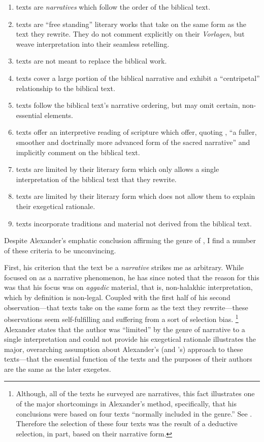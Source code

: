 \begin{enumerate}
    \item \rwb texts are \emph{narratives} which follow the order of the biblical text. 
    \item \rwb texts are ``free standing'' literary works that take on the same form as the text they rewrite. They do not comment explicitly on their \emph{Vorlagen}, but weave interpretation into their seamless retelling. 
    \item \rwb texts are not meant to replace the biblical work. 
    \item \rwb texts cover a large portion of the biblical narrative and exhibit a ``centripetal'' relationship to the biblical text. 
    \item \rwb texts follow the biblical text's narrative ordering, but may omit certain, non-essential elements. 
    \item \rwb texts offer an interpretive reading of scripture which offer, quoting \vermes, ``a fuller, smoother and doctrinally more advanced form of the sacred narrative''\autocite[Citing \vermes in][305]{schurer1986} and implicitly comment on the biblical text. 
    \item \rwb texts are limited by their literary form which only allows a single interpretation of the biblical text that they rewrite. 
    \item \rwb texts are limited by their literary form which does not allow them to explain their exegetical rationale. 
    \item \rwb texts incorporate traditions and material not derived from the biblical text.
\end{enumerate} 

Despite Alexander's emphatic conclusion affirming the genre of \RwB, I find a number of these criteria to be unconvincing.

First, his criterion that the text be a \emph{narrative} strikes me as arbitrary. While \vermes focused on \rwb as a narrative phenomenon, he has since noted that the reason for this was that his focus was on \emph{aggadic} material, that is, non-halakhic interpretation, which by definition is non-legal. Coupled with the first half of his second observation---that \rwb texts take on the same form as the text they rewrite---these observations seem self-fulfilling and suffering from a sort of selection bias.%
    \footnote{Although, all of the texts he surveyed are narratives, this fact illustrates one of the major shortcomings in Alexander's method, specifically, that his conclusions were based on four texts ``normally included in the genre.'' See \cite[99]{alexander_carson-williamson1988}. Therefore the selection of these four texts was the result of a deductive selection, in part, based on their narrative form.}
Alexander states that the author was ``limited'' by the genre of narrative to a single interpretation and could not provide his exegetical rationale illustrates the major, overarching assumption about Alexander's (and \vermes's) approach to these texts---that the essential function of the texts and the purposes of their authors are the same as the later exegetes.

